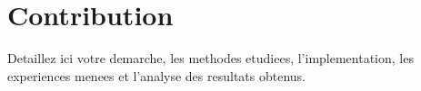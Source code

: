 \chapter{Contribution}

Detaillez ici votre demarche, les methodes etudiees, l'implementation, les
experiences menees et l'analyse des resultats obtenus.
